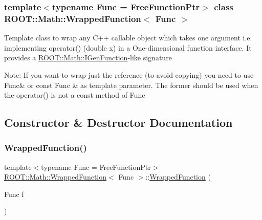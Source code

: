 \subsubsection*{template$<$typename Func = Free\+Function\+Ptr$>$\newline
class R\+O\+O\+T\+::\+Math\+::\+Wrapped\+Function$<$ Func $>$}

Template class to wrap any C++ callable object which takes one argument i.\+e. implementing operator() (double x) in a One-\/dimensional function interface. It provides a \mbox{\hyperlink{namespaceROOT_1_1Math_afe6400b4439b79d54c41fb9f5c5af171}{R\+O\+O\+T\+::\+Math\+::\+I\+Gen\+Function}}-\/like signature

Note\+: If you want to wrap just the reference (to avoid copying) you need to use Func\& or const Func \& as template parameter. The former should be used when the operator() is not a const method of Func 

\subsection{Constructor \& Destructor Documentation}
\mbox{\label{classROOT_1_1Math_1_1WrappedFunction_aa5dcde11a189a6fccb4262d341f31146}} 
\subsubsection{\texorpdfstring{WrappedFunction()}{WrappedFunction()}\hspace{0.1cm}{\footnotesize\ttfamily [1/3]}}
{\footnotesize\ttfamily template$<$typename Func  = Free\+Function\+Ptr$>$ \\
\mbox{\hyperlink{classROOT_1_1Math_1_1WrappedFunction}{R\+O\+O\+T\+::\+Math\+::\+Wrapped\+Function}}$<$ Func $>$\+::\mbox{\hyperlink{classROOT_1_1Math_1_1WrappedFunction}{Wrapped\+Function}} (\begin{DoxyParamCaption}\item[{Func}]{f }\end{DoxyParamCaption})\hspace{0.3cm}{\ttfamily [inline]}}

